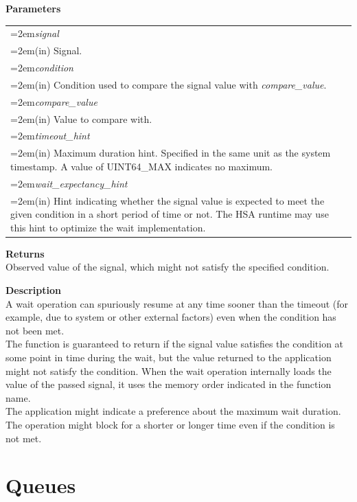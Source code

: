 \documentclass[final]{book}
\newcommand{\hsaarg}[1]{\textit{#1}}
\begin{document}
\noindent\textbf{Parameters}\\[-6mm]
\noindent\begin{longtable}{@{}>{\hangindent=2em}p{\textwidth}}
\hsaarg{signal}\\\hspace{2em}(in) Signal.\\[2mm]
\hsaarg{condition}\\\hspace{2em}(in) Condition used to compare the signal value with \textit{compare_\-value}.\\[2mm]
\hsaarg{compare_\-value}\\\hspace{2em}(in) Value to compare with.\\[2mm]
\hsaarg{timeout_\-hint}\\\hspace{2em}(in) Maximum duration hint. Specified in the same unit as the system timestamp. A value of UINT64_\-MAX indicates no maximum.\\[2mm]
\hsaarg{wait_\-expectancy_\-hint}\\\hspace{2em}(in) Hint indicating whether the signal value is expected to meet the given condition in a short period of time or not. The HSA runtime may use this hint to optimize the wait implementation.
\end{longtable}
\vspace{-5mm}\noindent\textbf{Returns}\\[1mm]
Observed value of the signal, which might not satisfy the specified condition.

\noindent\textbf{Description}\\[1mm]
A wait operation can spuriously resume at any time sooner than the timeout (for example, due to system or other external factors) even when the condition has not been met.\\[2mm]
The function is guaranteed to return if the signal value satisfies the condition at some point in time during the wait, but the value returned to the application might not satisfy the condition. When the wait operation internally loads the value of the passed signal, it uses the memory order indicated in the function name.\\[2mm]
The application might indicate a preference about the maximum wait duration. The operation might block for a shorter or longer time even if the condition is not met.
 

\section{Queues} \label{sec:queues}
\end{document}
